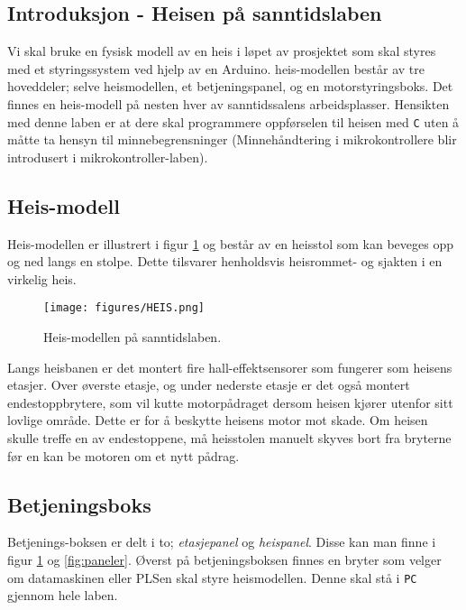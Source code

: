 \begin{alphasection}
\clearpage

\section{Introduksjon - Heisen på sanntidslaben}\label{sec:2-innføringheis}

Vi skal bruke en fysisk modell av en heis i løpet av prosjektet som skal styres med et styringssystem ved hjelp av en Arduino. heis-modellen består av tre hoveddeler; selve heismodellen, et betjeningspanel, og en motorstyringsboks. Det finnes en heis-modell på nesten hver av sanntidssalens arbeidsplasser. Hensikten med denne laben er at dere skal programmere oppførselen til heisen med \verb|C| uten å måtte ta hensyn til minnebegrensninger (Minnehåndtering i mikrokontrollere blir introdusert i mikrokontroller-laben).



\subsection{Heis-modell}
Heis-modellen er illustrert i figur \ref{fig:heis-modell-sal} og består av en heisstol som kan beveges opp og ned langs en stolpe. Dette tilsvarer henholdsvis heisrommet- og sjakten i en virkelig heis.

\begin{figure}[ht]
    \centering
    \texttt{[image: figures/HEIS.png]}
    \caption{Heis-modellen på sanntidslaben.}
    \label{fig:heis-modell-sal}
\end{figure}

Langs heisbanen er det montert fire hall-effektsensorer som fungerer som heisens etasjer. Over øverste etasje, og under nederste etasje er det også montert endestoppbrytere, som vil kutte motorpådraget dersom heisen kjører utenfor sitt lovlige område. Dette er for å beskytte heisens motor mot skade. Om heisen skulle treffe en av endestoppene, må heisstolen manuelt skyves bort fra bryterne før en kan be motoren om et nytt pådrag.

\subsection{Betjeningsboks}
Betjenings-boksen er delt i to; \textit{etasjepanel} og \textit{heispanel}. Disse kan man finne i figur \ref{fig:heis-modell-sal} og \ref{fig:paneler}. Øverst på betjeningsboksen finnes en bryter som velger om datamaskinen eller PLSen skal styre heismodellen. Denne skal stå i \verb|PC| gjennom hele laben.


\end{alphasection}
